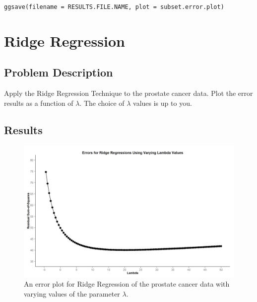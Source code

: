 \documentclass{article}
\begin{document}
\begin{verbatim}
ggsave(filename = RESULTS.FILE.NAME, plot = subset.error.plot)
\end{verbatim}

\newpage
\section{Ridge Regression}
\subsection{Problem Description}
Apply the Ridge Regression Technique to the prostate cancer data. Plot the error results as a function of $\lambda$. The choice of $\lambda$ values is up to you.

\subsection{Results}
  \begin{figure}[h!]
    \centering
    \includegraphics[width=.8\linewidth]{HW03_Exercise02}
    \caption{An error plot for Ridge Regression of the prostate cancer data with varying values of the parameter $\lambda$.}
    \label{fig:HW03_Exercise02}
  \end{figure}
\end{document}
